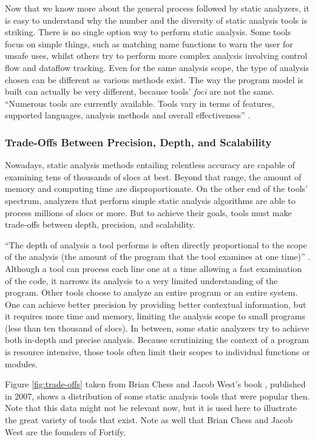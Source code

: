 Now that we know more about the general process followed by static analyzers, it is easy to understand why the number and the diversity of static analysis tools is striking. There is no single option way to perform static analysis. Some tools focus on simple things, such as matching name functions to warn the user for unsafe uses, whilst others try to perform more complex analysis involving control flow and dataflow tracking. Even for the same analysis scope, the type of analysis chosen can be different as various methods exist. The way the program model is built can actually be very different, because tools' \emph{foci} are not the same. ``Numerous tools are currently available. Tools vary in terms of features, supported languages, analysis methods and overall effectiveness'' \cite{delaitre2013massive}.

\subsubsection{Trade-Offs Between Precision, Depth, and Scalability}

Nowadays, static analysis methods entailing relentless accuracy are capable of examining tens of thousands of \glspl{sloc} at best. Beyond that range, the amount of memory and computing time are disproportionate. On the other end of the tools' spectrum, analyzers that perform simple static analysis algorithms are able to process millions of \glspl{sloc} or more. But to achieve their goals, tools must make trade-offs between depth, precision, and scalability.

``The depth of analysis a tool performs is often directly proportional to the scope of the analysis (the amount of the program that the tool examines at one time)'' \cite{chess2007secure}. Although a tool can process each line one at a time allowing a fast examination of the code, it narrows its analysis to a very limited understanding of the program. Other tools choose to analyze an entire program or an entire system. One can achieve better precision by providing better contextual information, but it requires more time and memory, limiting the analysis scope to small programs (less than ten thousand of \glspl{sloc}). In between, some static analyzers try to achieve both in-depth and precise analysis. Because scrutinizing the context of a program is resource intensive, those tools often limit their scopes to individual functions or modules.

Figure \ref{fig:trade-offs} taken from Brian Chess and Jacob West's book \cite{chess2007secure}, published in 2007, shows a distribution of some static analysis tools that were popular then. Note that this data might not be relevant now, but it is used here to illustrate the great variety of tools that exist. Note as well that Brian Chess and Jacob West are the founders of Fortify.

